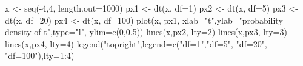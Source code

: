\begin{Schunk}
\begin{Sinput}
 x <- seq(-4,4, length.out=1000)
 px1 <- dt(x, df=1)
 px2 <- dt(x, df=5)
 px3 <- dt(x, df=20)
 px4 <- dt(x, df=100)
 plot(x, px1, xlab="t",ylab="probability density of t",type="l", ylim=c(0,0.5))
 lines(x,px2, lty=2)
 lines(x,px3, lty=3)
 lines(x,px4, lty=4)
 legend("topright",legend=c("df=1","df=5", "df=20", "df=100"),lty=1:4)
\end{Sinput}
\end{Schunk}
